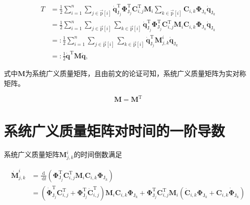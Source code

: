 \[
\begin{aligned}
T & =\frac{1}{2} \sum_{i=1}^{n} \sum_{j \in \overrightarrow{\mathrm{p}}[i]} \dot{\boldsymbol{q}}_{\mathrm{J}_{j}}^{\mathrm{T}} \boldsymbol{\Phi}_{\mathrm{J}_{j}}^{\mathrm{T}} \boldsymbol{C}_{i, j}^{\mathrm{T}} \boldsymbol{M}_{i} \sum_{k \in \overrightarrow{\mathrm{p}}[i]} \boldsymbol{C}_{i, k} \boldsymbol{\Phi}_{\mathrm{J}_{k}} \dot{\boldsymbol{q}}_{\mathrm{J}_{k}} \\
& =\frac{1}{2} \sum_{i=1}^{n} \sum_{j \in \overrightarrow{\mathrm{p}}[i]} \sum_{k \in \overrightarrow{\mathrm{p}}[i]} \dot{\boldsymbol{q}}_{\mathrm{J}_{j}}^{\mathrm{T}} \boldsymbol{\Phi}_{\mathrm{J}_{j}}^{\mathrm{T}} \boldsymbol{C}_{i, j}^{\mathrm{T}} \boldsymbol{M}_{i} \boldsymbol{C}_{i, k} \boldsymbol{\Phi}_{\mathrm{J}_{k}} \dot{\boldsymbol{q}}_{\mathrm{J}_{k}} \\
& =: \frac{1}{2} \sum_{i=1}^{n} \sum_{j \in \overrightarrow{\mathrm{p}}[i]} \sum_{k \in \overrightarrow{\mathrm{p}}[i]} \dot{\boldsymbol{q}}_{\mathrm{J}_{j}}^{\mathrm{T}} \boldsymbol{M}_{j, k}^{i} \dot{\boldsymbol{q}}_{\mathrm{J}_{k}} \\
& =: \frac{1}{2} \dot{\boldsymbol{q}}^{\mathrm{T}} \boldsymbol{M} \dot{\boldsymbol{q}},
\end{aligned}
\]

式中$\boldsymbol{M}$为系统广义质量矩阵，且由前文的论证可知，系统广义质量矩阵为实对称矩阵。

\[
\boldsymbol{M}=\boldsymbol{M}^\mathrm{T}
\]
\section{系统广义质量矩阵对时间的一阶导数}
系统广义质量矩阵$\boldsymbol{M}_{j, k}^{i}$的时间倒数满足

\[
\begin{aligned}
\dot{\boldsymbol{M}}_{j, k}^{i} & =\frac{\mathrm{d}}{\mathrm{~d} t}\left(\boldsymbol{\Phi}_{\mathrm{J}_{j}}^{\mathrm{T}} \boldsymbol{C}_{i, j}^{\mathrm{T}} \boldsymbol{M}_{i} \boldsymbol{C}_{i, k} \boldsymbol{\Phi}_{\mathrm{J}_{k}}\right) \\
& =\left(\dot{\boldsymbol{\Phi}}_{\mathrm{J}_{j}}^{\mathrm{T}} \boldsymbol{C}_{i, j}^{\mathrm{T}}+\boldsymbol{\Phi}_{\mathrm{J}_{j}}^{\mathrm{T}} \dot{\boldsymbol{C}}_{i, j}^{\mathrm{T}}\right) \boldsymbol{M}_{i} \boldsymbol{C}_{i, k} \boldsymbol{\Phi}_{\mathrm{J}_{k}}+\boldsymbol{\Phi}_{\mathrm{J}_{j}}^{\mathrm{T}} \boldsymbol{C}_{i, j}^{\mathrm{T}} \boldsymbol{M}_{i}\left(\dot{\boldsymbol{C}}_{i, k} \boldsymbol{\Phi}_{\mathrm{J}_{k}}+\boldsymbol{C}_{i, k} \dot{\boldsymbol{\Phi}}_{\mathrm{J}_{k}}\right)
\end{aligned}
\]

